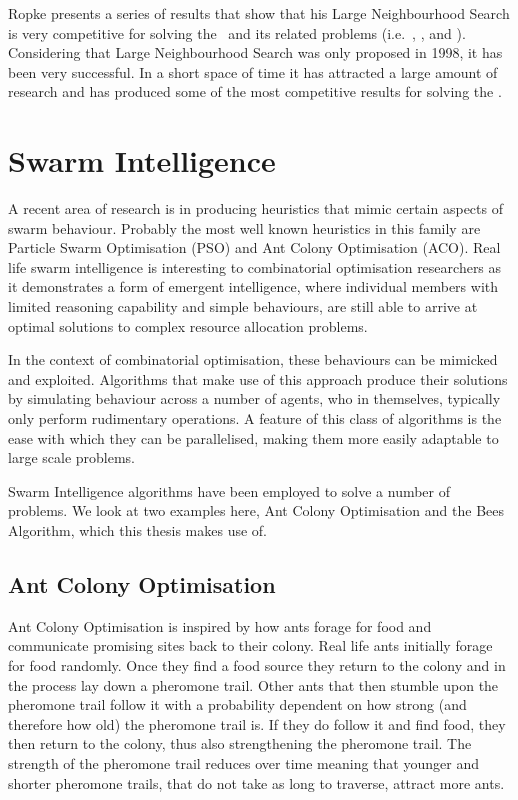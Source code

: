 Ropke presents a series of results that show that his Large Neighbourhood Search is very competitive for solving the \VRP\ and its related problems (i.e.~\VRPTW, \PDPTW, and \DARP). Considering that Large Neighbourhood Search was only proposed in 1998, it has been very successful. In a short space of time it has attracted a large amount of research and has produced some of the most competitive results for solving the \VRP.

\section{Swarm Intelligence}
\label{sec:si}

A recent area of research is in producing heuristics that mimic certain aspects of swarm behaviour. Probably the most well known heuristics in this family are Particle Swarm Optimisation (PSO) and Ant Colony Optimisation (ACO). Real life swarm intelligence is interesting to combinatorial optimisation researchers as it demonstrates a form of emergent intelligence, where individual members with limited reasoning capability and simple behaviours, are still able to arrive at optimal solutions to complex resource allocation problems.

In the context of combinatorial optimisation, these behaviours can be mimicked and exploited. Algorithms that make use of this approach produce their solutions by simulating behaviour across a number of agents, who in themselves, typically only perform rudimentary operations. A feature of this class of algorithms is the ease with which they can be parallelised, making them more easily adaptable to large scale problems.

Swarm Intelligence algorithms have been employed to solve a number of problems. We look at two examples here, Ant Colony Optimisation and the Bees Algorithm, which this thesis makes use of.

\subsection{Ant Colony Optimisation}

Ant Colony Optimisation is inspired by how ants forage for food and communicate promising sites back to their colony. Real life ants initially forage for food randomly. Once they find a food source they return to the colony and in the process lay down a pheromone trail. Other ants that then stumble upon the pheromone trail follow it with a probability dependent on how strong (and therefore how old) the pheromone trail is. If they do follow it and find food, they then return to the colony, thus also strengthening the pheromone trail. The strength of the pheromone trail reduces over time meaning that younger and shorter pheromone trails, that do not take as long to traverse, attract more ants.  

